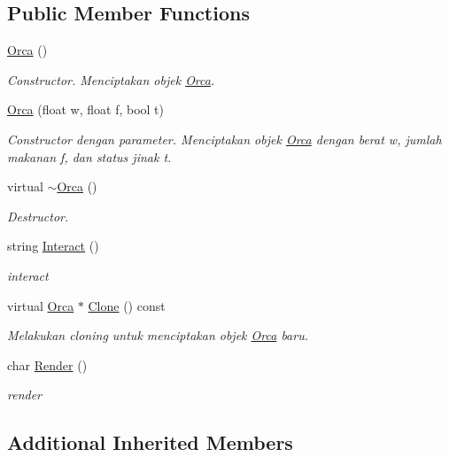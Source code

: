 \subsection*{Public Member Functions}
\begin{DoxyCompactItemize}
\item 
\hyperlink{classOrca_a1efb2589b67f95863f7c8a653cfb13f3}{Orca} ()
\begin{DoxyCompactList}\small\item\em Constructor. Menciptakan objek \hyperlink{classOrca}{Orca}. \end{DoxyCompactList}\item 
\hyperlink{classOrca_aed38e6130ea0084cc65031262bbdf39a}{Orca} (float w, float f, bool t)
\begin{DoxyCompactList}\small\item\em Constructor dengan parameter. Menciptakan objek \hyperlink{classOrca}{Orca} dengan berat w, jumlah makanan f, dan status jinak t. \end{DoxyCompactList}\item 
virtual \hyperlink{classOrca_a964d6cd8b816cfa70f5194457b9382c0}{$\sim$\+Orca} ()
\begin{DoxyCompactList}\small\item\em Destructor. \end{DoxyCompactList}\item 
string \hyperlink{classOrca_adf95ca04578ac04aaa717ef2dd11bf4c}{Interact} ()
\begin{DoxyCompactList}\small\item\em interact \end{DoxyCompactList}\item 
virtual \hyperlink{classOrca}{Orca} $\ast$ \hyperlink{classOrca_ac44eb30486ba4051eefa914dc8cd670f}{Clone} () const 
\begin{DoxyCompactList}\small\item\em Melakukan cloning untuk menciptakan objek \hyperlink{classOrca}{Orca} baru. \end{DoxyCompactList}\item 
char \hyperlink{classOrca_a0673bfc8e70af67b463a4fcae224d9d5}{Render} ()
\begin{DoxyCompactList}\small\item\em render \end{DoxyCompactList}\end{DoxyCompactItemize}
\subsection*{Additional Inherited Members}


